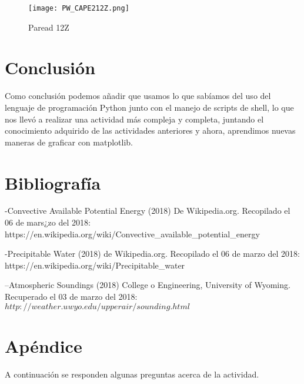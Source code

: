 \documentclass[12pt]{article}
\begin{document}
\begin{figure}
\begin{centering}
  \texttt{[image: PW\_CAPE212Z.png]}
  \caption{Paread 12Z}
\end{centering}
\end{figure}

\section{Conclusión}

Como conclusión podemos añadir que usamos lo que sabíamos del uso del lenguaje de programación Python junto con el manejo de scripts de shell, lo que nos llevó a realizar una actividad más compleja y completa, juntando el conocimiento adquirido de las actividades anteriores y ahora, aprendimos nuevas maneras de graficar con matplotlib.

\section{Bibliografía}

-Convective Available Potential Energy (2018) De Wikipedia.org. Recopilado el 06 de mars¿zo del 2018: https://en.wikipedia.org/wiki/Convective\_available\_potential\_energy

-Precipitable Water (2018) de Wikipedia.org. Recopilado el 06 de marzo del 2018: https://en.wikipedia.org/wiki/Precipitable\_water

--Atmospheric Soundings (2018) College o Engineering, University of Wyoming. Recuperado el 03 de marzo del 2018: $http://weather.uwyo.edu/upperair/sounding.html$

\section{Apéndice}

A continuación se responden algunas preguntas acerca de la actividad.
\end{document}
